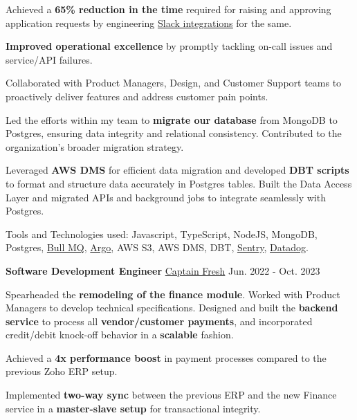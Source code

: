 \begin{cventries}
{\begin{cvitems}
    \item {Achieved a \textbf{65\% reduction in the time} required for raising and approving application requests by engineering \href{https://zluri-1.wistia.com/medias/svw7jw37f1}{\underline{Slack integrations}} for the same.}
    \item {\textbf{Improved operational excellence} by promptly tackling on-call issues and service/API failures.}
    \item {Collaborated with Product Managers, Design, and Customer Support teams to proactively deliver features and address customer pain points.}
    \item {Led the efforts within my team to \textbf{migrate our database} from MongoDB to Postgres, ensuring data integrity and relational consistency. Contributed to the organization's broader migration strategy.}
    \item {Leveraged \textbf{AWS DMS} for efficient data migration and developed \textbf{DBT scripts} to format and structure data accurately in Postgres tables. Built the Data Access Layer and migrated APIs and background jobs to integrate seamlessly with Postgres.}
    \item {Tools and Technologies used: Javascript, TypeScript, NodeJS, MongoDB, Postgres, \href{https://docs.bullmq.io/}{Bull MQ}, \href{https://argoproj.github.io/workflows/}{Argo}, AWS S3, AWS DMS, DBT, \href{https://sentry.io/welcome/}{Sentry}, \href{https://www.datadoghq.com/}{Datadog}.}
\end{cvitems}}
\vspace{3mm}
\cventry
{\textbf{Software Development Engineer}} %
{\href{https://www.captainfresh.in/}{Captain Fresh}} %
{Jun. 2022 - Oct. 2023} %
{} %
{\begin{cvitems} %
    \item {Spearheaded the \textbf{remodeling of the finance module}. Worked with Product Managers to develop technical specifications. Designed and built the \textbf{backend service} to process all \textbf{vendor/customer payments}, and incorporated credit/debit knock-off behavior in a \textbf{scalable} fashion.}
    \item {Achieved a \textbf{4x performance boost} in payment processes compared to the previous Zoho ERP setup. }
    \item {Implemented \textbf{two-way sync} between the previous ERP and the new Finance service in a \textbf{master-slave setup} for transactional integrity.}

\end{cvitems}}
\end{cventries}
